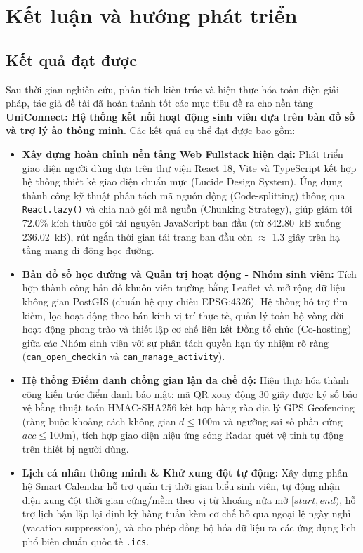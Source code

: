 \chapter{Kết luận và hướng phát triển}

\section{Kết quả đạt được}
Sau thời gian nghiên cứu, phân tích kiến trúc và hiện thực hóa toàn diện giải pháp, tác giả đề tài đã hoàn thành tốt các mục tiêu đề ra cho nền tảng \textbf{UniConnect: Hệ thống kết nối hoạt động sinh viên dựa trên bản đồ số và trợ lý ảo thông minh}. Các kết quả cụ thể đạt được bao gồm:

\begin{itemize}[leftmargin=*]
    \item \textbf{Xây dựng hoàn chỉnh nền tảng Web Fullstack hiện đại:} Phát triển giao diện người dùng dựa trên thư viện React 18, Vite và TypeScript kết hợp hệ thống thiết kế giao diện chuẩn mực (Lucide Design System). Ứng dụng thành công kỹ thuật phân tách mã nguồn động (Code-splitting) thông qua \texttt{React.lazy()} và chia nhỏ gói mã nguồn (Chunking Strategy), giúp giảm tới 72.0\% kích thước gói tài nguyên JavaScript ban đầu (từ 842.80~kB xuống 236.02~kB), rút ngắn thời gian tải trang ban đầu còn $\approx$ 1.3 giây trên hạ tầng mạng di động học đường.
    
    \item \textbf{Bản đồ số học đường và Quản trị hoạt động - Nhóm sinh viên:} Tích hợp thành công bản đồ khuôn viên trường bằng Leaflet và mở rộng dữ liệu không gian PostGIS (chuẩn hệ quy chiếu EPSG:4326). Hệ thống hỗ trợ tìm kiếm, lọc hoạt động theo bán kính vị trí thực tế, quản lý toàn bộ vòng đời hoạt động phong trào và thiết lập cơ chế liên kết Đồng tổ chức (Co-hosting) giữa các Nhóm sinh viên với sự phân tách quyền hạn ủy nhiệm rõ ràng (\texttt{can\_open\_checkin} và \texttt{can\_manage\_activity}).
    
    \item \textbf{Hệ thống Điểm danh chống gian lận đa chế độ:} Hiện thực hóa thành công kiến trúc điểm danh bảo mật: mã QR xoay động 30 giây được ký số bảo vệ bằng thuật toán HMAC-SHA256 kết hợp hàng rào địa lý GPS Geofencing (ràng buộc khoảng cách không gian $d \le 100$m và ngưỡng sai số phần cứng $acc \le 100$m), tích hợp giao diện hiệu ứng sóng Radar quét vệ tinh tự động trên thiết bị người dùng.
    
    \item \textbf{Lịch cá nhân thông minh \& Khử xung đột tự động:} Xây dựng phân hệ Smart Calendar hỗ trợ quản trị thời gian biểu sinh viên, tự động nhận diện xung đột thời gian cứng/mềm theo vị từ khoảng nửa mở $[start, end)$, hỗ trợ lịch bận lặp lại định kỳ hàng tuần kèm cơ chế bỏ qua ngoại lệ ngày nghỉ (vacation suppression), và cho phép đồng bộ hóa dữ liệu ra các ứng dụng lịch phổ biến chuẩn quốc tế \texttt{.ics}.
    

\end{itemize}

